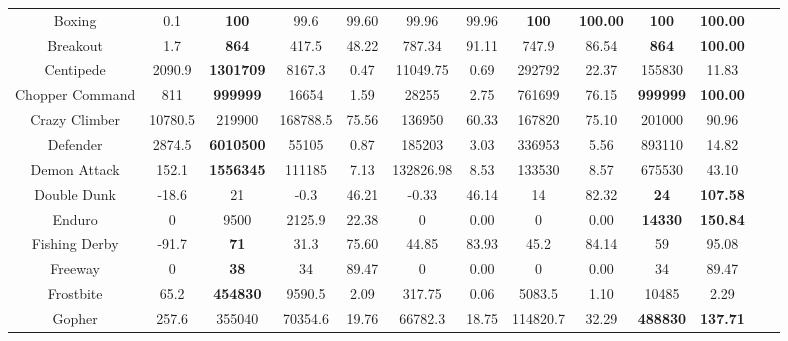 \documentclass[nohyperref]{article}
\newcommand{\best}[1]{\textbf{#1}}
\theoremstyle{plain}
\begin{document}
\begin{table}[!hb]
\begin{center}
\begin{tabular}{ |c |c |c| c c| c c|  c c |c c |c c |}
 Boxing             & 0.1       & \textbf{100}                & 99.6     &99.60   & 99.96      & 99.96      & \textbf{100}     & \textbf{100.00}    &\best{100}        &\best{100.00 }    \\
 Breakout           & 1.7       & \textbf{864}                & 417.5    &48.22   & 787.34     & 91.11      & 747.9   & 86.54     &\best{864}        &\best{100.00 }   \\
 Centipede          & 2090.9    & \textbf{1301709}   & 8167.3   &0.47    & 11049.75   & 0.69       & 292792  & 22.37     &155830            &11.83         \\
 Chopper Command    & 811       & \textbf{999999}             & 16654    &1.59    & 28255      & 2.75       & 761699  & 76.15     &\best{999999}     &\best{100.00 } \\
 Crazy Climber      & 10780.5   & 219900    & 168788.5 &75.56   & 136950     & 60.33      & 167820  & 75.10     &201000     &90.96                 \\
 Defender           & 2874.5    & \textbf{6010500}   & 55105    &0.87    & 185203     & 3.03       & 336953  & 5.56      &893110     &14.82                \\
 Demon Attack       & 152.1     & \textbf{1556345}   & 111185   &7.13    & 132826.98  & 8.53       & 133530  & 8.57      &675530     &43.10                 \\
 Double Dunk        & -18.6     & 21                 & -0.3     &46.21   & -0.33      & 46.14      & 14      & 82.32     &\best{24}      &\best{107.58} \\
 Enduro             & 0         & 9500               & 2125.9   &22.38   & 0          & 0.00       & 0       & 0.00      &\best{14330}      &\best{150.84  }\\
 Fishing Derby      & -91.7     & \textbf{71}        & 31.3     &75.60   & 44.85      & 83.93      & 45.2    & 84.14     &59                &95.08         \\
 Freeway            & 0         & \textbf{38}        & 34       &89.47   & 0          & 0.00       & 0       & 0.00      &34                &89.47          \\
 Frostbite          & 65.2      & \textbf{454830}    & 9590.5   &2.09    & 317.75     & 0.06       & 5083.5  & 1.10      &10485      &2.29                  \\          
 Gopher             & 257.6     & 355040             & 70354.6  &19.76   & 66782.3    & 18.75      & 114820.7& 32.29     &\best{488830}     &\best{137.71 } \\

\end{tabular}
\end{center}
\end{table}
\end{document}
